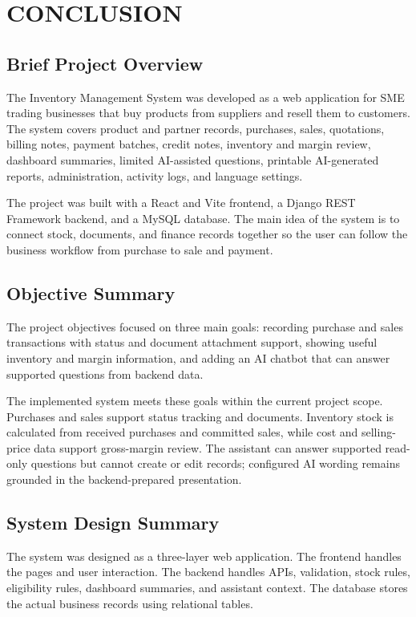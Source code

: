 \chapter{CONCLUSION}

\section{Brief Project Overview}
The Inventory Management System was developed as a web application for SME trading businesses that buy products from suppliers and resell them to customers. The system covers product and partner records, purchases, sales, quotations, billing notes, payment batches, credit notes, inventory and margin review, dashboard summaries, limited AI-assisted questions, printable AI-generated reports, administration, activity logs, and language settings.

The project was built with a React and Vite frontend, a Django REST Framework backend, and a MySQL database. The main idea of the system is to connect stock, documents, and finance records together so the user can follow the business workflow from purchase to sale and payment.

\section{Objective Summary}
The project objectives focused on three main goals: recording purchase and sales transactions with status and document attachment support, showing useful inventory and margin information, and adding an AI chatbot that can answer supported questions from backend data.

The implemented system meets these goals within the current project scope. Purchases and sales support status tracking and documents. Inventory stock is calculated from received purchases and committed sales, while cost and selling-price data support gross-margin review. The assistant can answer supported read-only questions but cannot create or edit records; configured AI wording remains grounded in the backend-prepared presentation.

\section{System Design Summary}
The system was designed as a three-layer web application. The frontend handles the pages and user interaction. The backend handles APIs, validation, stock rules, eligibility rules, dashboard summaries, and assistant context. The database stores the actual business records using relational tables.

